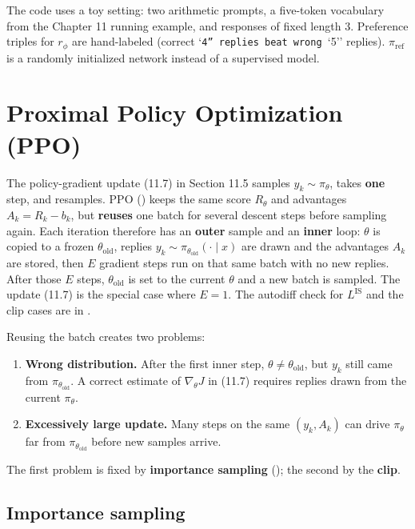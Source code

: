 The code uses a toy setting: two arithmetic prompts, a five-token vocabulary from the Chapter 11 running example, and responses of fixed length $3$. Preference triples for $r_\phi$ are hand-labeled (correct `\texttt{4'' replies beat wrong }`5'' replies). $\pi_{\text{ref}}$ is a randomly initialized network instead of a supervised model.




\section{Proximal Policy Optimization (PPO)}

The policy-gradient update (11.7) in Section 11.5 samples $y_k\sim\pi_\theta$, takes \textbf{one} step, and resamples. PPO () keeps the same score $R_\theta$ and advantages $A_k=R_k-b_k$, but \textbf{reuses} one batch for several descent steps before sampling again. Each iteration therefore has an \textbf{outer} sample and an \textbf{inner} loop: $\theta$ is copied to a frozen $\theta_{\mathrm{old}}$, replies $y_k\sim\pi_{\theta_{\mathrm{old}}}(\cdot\mid x)$ are drawn and the advantages $A_k$ are stored, then $E$ gradient steps run on that same batch with no new replies. After those $E$ steps, $\theta_{\mathrm{old}}$ is set to the current $\theta$ and a new batch is sampled. The update (11.7) is the special case where $E=1$. The autodiff check for $L^{\mathrm{IS}}$ and the clip cases are in .

Reusing the batch creates two problems:

\begin{enumerate}
\item \textbf{Wrong distribution.} After the first inner step, $\theta\neq\theta_{\mathrm{old}}$, but $y_k$ still came from $\pi_{\theta_{\mathrm{old}}}$. A correct estimate of $\nabla_\theta J$ in (11.7) requires replies drawn from the current $\pi_\theta$.
\item \textbf{Excessively large update.} Many steps on the same $(y_k,A_k)$ can drive $\pi_\theta$ far from $\pi_{\theta_{\mathrm{old}}}$ before new samples arrive.
\end{enumerate}
The first problem is fixed by \textbf{importance sampling} (); the second by the \textbf{clip}.

\subsection{Importance sampling}


